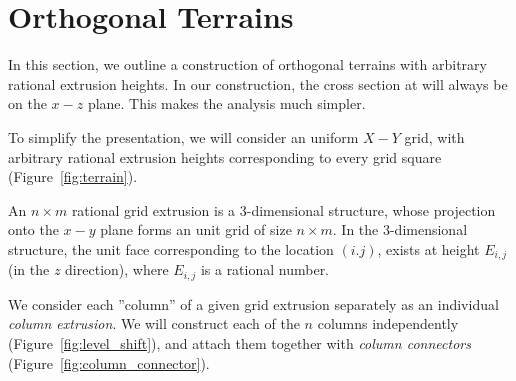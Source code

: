 \section{Orthogonal Terrains}
\label{sec:orthogonal_terrains}

In this section, we outline a construction of orthogonal terrains with arbitrary rational extrusion heights.
In our construction, the cross section at will always be on the $x-z$ plane.
This makes the analysis much simpler.
\graphicspath{{./figures/}}
\begin{figure}[!htb]
    \centering
    \caption{}
\end{figure}%

To simplify the presentation, we will consider an uniform $X-Y$ grid,
with arbitrary rational extrusion heights corresponding to every grid square (Figure~\ref{fig:terrain}).
\begin{definition}
An $n\times m$ rational grid extrusion is a 3-dimensional structure,
whose projection onto the $x-y$ plane forms an unit grid of size $n\times m$.
In the 3-dimensional structure, the unit face corresponding to the location $(i.j)$,
exists at height $E_{i,j}$ (in the $z$ direction), where $E_{i,j}$ is a rational number.
\end{definition}

We consider each ''column'' of a given grid extrusion separately as an individual \emph{column extrusion}.
We will construct each of the $n$ columns independently (Figure~\ref{fig:level_shift}),
and attach them together with \emph{column connectors} (Figure~\ref{fig:column_connector}).



